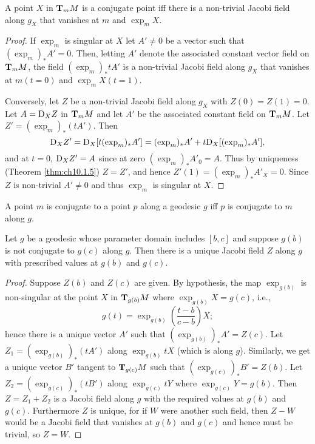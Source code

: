 \documentclass[../main]{subfiles}
\begin{document}
\begin{theorem} \label{thm:ch10.1.8}
A point $X$ in $\tangentspace{M}{m}$ is a conjugate point iff there is a non-trivial Jacobi field along $g_X$ that vanishes at $m$ and $\exp_m X$.
\end{theorem}

\begin{proof}
If $\exp_m$ is singular at $X$ let $A'\neq 0$ be a vector such that $(\exp_m)_\ast A'=0$. Then, letting $A'$ denote the associated constant vector field on $\tangentspace{M}{m}$, the field $(\exp_m)_\ast tA'$ is a non-trivial Jacobi field along $g_X$ that vanishes at $m(t=0)$ and $\exp_m X (t=1)$.

Conversely, let $Z$ be a non-trivial Jacobi field along $g_X$ with $Z(0)=Z(1)=0$. Let $A=\connection_X Z$ in $\tangentspace{M}{m}$ and let $A'$ be the associated constant field on $\tangentspace{M}{m}$. Let $Z'=(\exp_m)_\ast(tA')$. Then
\[
\connection_X Z'
=
\connection_X [ t(\exp_m)_\ast A' ]
=
(\exp_m)_\ast A' + t \connection_X [(\exp_m)_\ast A'],
\]
and at $t=0$, $\connection_X Z'=A$ since at zero $(\exp_m)_\ast A'_0=A$. Thus by uniqueness (Theorem \ref{thm:ch10.1.5}) $Z=Z'$, and hence $Z'(1)=(\exp_m)_\ast A'_X = 0$. Since $Z$ is non-trivial $A'\neq 0$ and thus $\exp_m$ is singular at $X$.
\end{proof}



\begin{corollary} \label{cor:ch10.1.9}
A point $m$ is conjugate to a point $p$ along a geodesic $g$ iff $p$ is conjugate to $m$ along $g$.
\end{corollary}



\begin{theorem} \label{thm:ch10.1.10}
Let $g$ be a geodesic whose parameter domain includes $[b,c]$ and suppose $g(b)$ is not conjugate to $g(c)$ along $g$. Then there is a unique Jacobi field $Z$ along $g$ with prescribed values at $g(b)$ and $g(c)$.
\end{theorem}

\begin{proof}
Suppose $Z(b)$ and $Z(c)$ are given. By hypothesis, the map $\exp_{g(b)}$ is non-singular at the point $X$ in $\tangentspace{M}{g(b)}$ where $\exp_{g(b)}X=g(c)$, i.e.,
\[
g(t)=\exp_{g(b)}\left( \frac{t-b}{c-b} \right)X;
\]
hence there is a unique vector $A'$ such that $(\exp_{g(b)})_\ast A' = Z(c)$. Let \newline $Z_1=(\exp_{g(b)})_\ast (tA')$ along $\exp_{g(b)}tX$ (which is along $g$). Similarly, we get a unique vector $B'$ tangent to $\tangentspace{M}{g(c)}$ such that $(\exp_{g(c)})_\ast B' = Z(b)$. Let $Z_2=(\exp_{g(c)})_\ast (tB')$ along $\exp_{g(c)}tY$ where $\exp_{g(c)}Y = g(b)$. Then $Z=Z_1+Z_2$ is a Jacobi field along $g$ with the required values at $g(b)$ and $g(c)$. Furthermore $Z$ is unique, for if $W$ were another such field, then $Z-W$ would be a Jacobi field that vanishes at $g(b)$ and $g(c)$ and hence must be trivial, so $Z=W$.
\end{proof}
\end{document}
